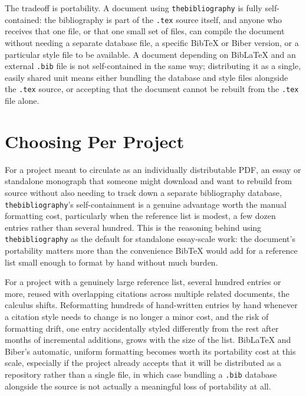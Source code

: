 The tradeoff is portability. A document using \texttt{thebibliography} is fully self-contained: the bibliography is part of the \texttt{.tex} source itself, and anyone who receives that one file, or that one small set of files, can compile the document without needing a separate database file, a specific BibTeX or Biber version, or a particular style file to be available. A document depending on BibLaTeX and an external \texttt{.bib} file is not self-contained in the same way; distributing it as a single, easily shared unit means either bundling the database and style files alongside the \texttt{.tex} source, or accepting that the document cannot be rebuilt from the \texttt{.tex} file alone.

\hypertarget{choosing-per-project}{%
\section{Choosing Per Project}\label{choosing-per-project}}

For a project meant to circulate as an individually distributable PDF, an essay or standalone monograph that someone might download and want to rebuild from source without also needing to track down a separate bibliography database, \texttt{thebibliography}'s self-containment is a genuine advantage worth the manual formatting cost, particularly when the reference list is modest, a few dozen entries rather than several hundred. This is the reasoning behind using \texttt{thebibliography} as the default for standalone essay-scale work: the document's portability matters more than the convenience BibTeX would add for a reference list small enough to format by hand without much burden.

For a project with a genuinely large reference list, several hundred entries or more, reused with overlapping citations across multiple related documents, the calculus shifts. Reformatting hundreds of hand-written entries by hand whenever a citation style needs to change is no longer a minor cost, and the risk of formatting drift, one entry accidentally styled differently from the rest after months of incremental additions, grows with the size of the list. BibLaTeX and Biber's automatic, uniform formatting becomes worth its portability cost at this scale, especially if the project already accepts that it will be distributed as a repository rather than a single file, in which case bundling a \texttt{.bib} database alongside the source is not actually a meaningful loss of portability at all.

